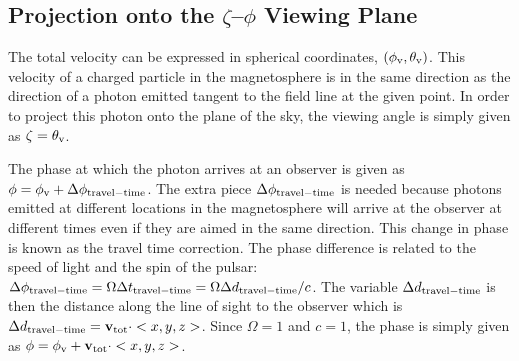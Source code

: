 \subsection{Projection onto the $\zeta$--$\phi$ Viewing Plane}

The total velocity can be expressed in spherical coordinates, $(\phi_{\rm v},\theta_{\rm v})$.
This velocity of a charged particle in the magnetosphere is
in the same direction as the direction of a photon emitted tangent to the field line
at the given point.
In order to project this photon onto the plane of the sky, 
the viewing angle is simply given as $\zeta=\theta_{\rm v}$.

The phase at which the photon arrives at an observer is given as
$\phi=\phi_{\rm v} +\Delta\phi_{\rm{travel-time}}$.  The extra piece $\Delta\phi_{\rm{travel-time}}$
is needed because photons emitted at different locations in the magnetosphere
will arrive at the observer at different times even if they are aimed in the same direction.
This change in phase is known as the travel time correction.
The phase difference is related to the speed of light and the spin of the pulsar:
$\Delta\phi_{\rm{travel-time}}=\Omega \Delta t_{\rm{travel-time}}=\Omega \Delta d_{\rm{travel-time}}/c$.
The variable $\Delta d_{\rm{travel-time}}$ is then the distance along the line of sight 
to the observer which is $\Delta d_{\rm{travel-time}}=\vec{v}_{\rm tot} \cdot <x,y,z>$.  
Since $\Omega=1$ and $c=1$, the phase is simply given as
$\phi=\phi_{\rm v} + \vec{v}_{\rm tot} \cdot <x,y,z>$.


